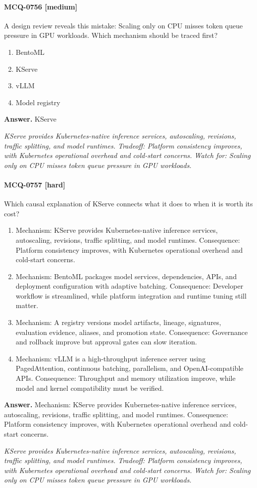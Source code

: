 \paragraph{MCQ-0756 [medium]} A design review reveals this mistake: Scaling only on CPU misses token queue pressure in GPU workloads. Which mechanism should be traced first?
\begin{enumerate}[label=\Alph*.]
\item BentoML
\item KServe
\item vLLM
\item Model registry
\end{enumerate}
\noindent\textbf{Answer.} KServe
\par\textit{KServe provides Kubernetes-native inference services, autoscaling, revisions, traffic splitting, and model runtimes. Tradeoff: Platform consistency improves, with Kubernetes operational overhead and cold-start concerns. Watch for: Scaling only on CPU misses token queue pressure in GPU workloads.}
\paragraph{MCQ-0757 [hard]} Which causal explanation of KServe connects what it does to when it is worth its cost?
\begin{enumerate}[label=\Alph*.]
\item Mechanism: KServe provides Kubernetes-native inference services, autoscaling, revisions, traffic splitting, and model runtimes. Consequence: Platform consistency improves, with Kubernetes operational overhead and cold-start concerns.
\item Mechanism: BentoML packages model services, dependencies, APIs, and deployment configuration with adaptive batching. Consequence: Developer workflow is streamlined, while platform integration and runtime tuning still matter.
\item Mechanism: A registry versions model artifacts, lineage, signatures, evaluation evidence, aliases, and promotion state. Consequence: Governance and rollback improve but approval gates can slow iteration.
\item Mechanism: vLLM is a high-throughput inference server using PagedAttention, continuous batching, parallelism, and OpenAI-compatible APIs. Consequence: Throughput and memory utilization improve, while model and kernel compatibility must be verified.
\end{enumerate}
\noindent\textbf{Answer.} Mechanism: KServe provides Kubernetes-native inference services, autoscaling, revisions, traffic splitting, and model runtimes. Consequence: Platform consistency improves, with Kubernetes operational overhead and cold-start concerns.
\par\textit{KServe provides Kubernetes-native inference services, autoscaling, revisions, traffic splitting, and model runtimes. Tradeoff: Platform consistency improves, with Kubernetes operational overhead and cold-start concerns. Watch for: Scaling only on CPU misses token queue pressure in GPU workloads.}
